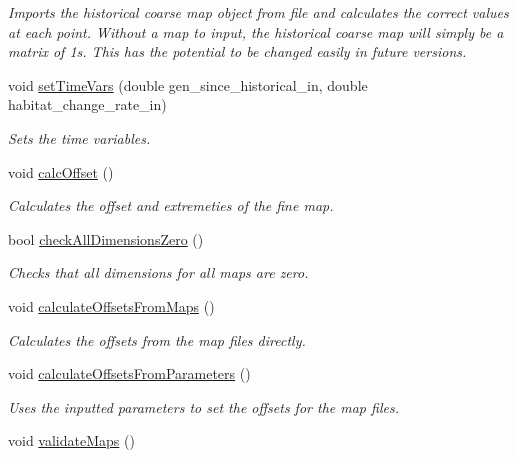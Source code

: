 \begin{DoxyCompactItemize}
\begin{DoxyCompactList}\small\item\em Imports the historical coarse map object from file and calculates the correct values at each point. Without a map to input, the historical coarse map will simply be a matrix of 1s. This has the potential to be changed easily in future versions. \end{DoxyCompactList}\item 
void \hyperlink{class_landscape_ac8aa9b3c8003cbc52c929e7532c0b0aa}{set\+Time\+Vars} (double gen\+\_\+since\+\_\+historical\+\_\+in, double habitat\+\_\+change\+\_\+rate\+\_\+in)
\begin{DoxyCompactList}\small\item\em Sets the time variables. \end{DoxyCompactList}\item 
void \hyperlink{class_landscape_ae4d6050ab25b5c0dca01446b0e59bfb1}{calc\+Offset} ()
\begin{DoxyCompactList}\small\item\em Calculates the offset and extremeties of the fine map. \end{DoxyCompactList}\item 
bool \hyperlink{class_landscape_a998dcf0659841398c2eb336c91ecdfba}{check\+All\+Dimensions\+Zero} ()
\begin{DoxyCompactList}\small\item\em Checks that all dimensions for all maps are zero. \end{DoxyCompactList}\item 
void \hyperlink{class_landscape_a67fc255ef73d331034f2a626117035e8}{calculate\+Offsets\+From\+Maps} ()
\begin{DoxyCompactList}\small\item\em Calculates the offsets from the map files directly. \end{DoxyCompactList}\item 
void \hyperlink{class_landscape_a739549f09fbfbc36674e1a27ad8e9363}{calculate\+Offsets\+From\+Parameters} ()\hypertarget{class_landscape_a739549f09fbfbc36674e1a27ad8e9363}{}\label{class_landscape_a739549f09fbfbc36674e1a27ad8e9363}

\begin{DoxyCompactList}\small\item\em Uses the inputted parameters to set the offsets for the map files. \end{DoxyCompactList}\item 
void \hyperlink{class_landscape_a9181afc2546082c9d4798e16e033b0f1}{validate\+Maps} ()\hypertarget{class_landscape_a9181afc2546082c9d4798e16e033b0f1}{}\label{class_landscape_a9181afc2546082c9d4798e16e033b0f1}


\end{DoxyCompactItemize}
